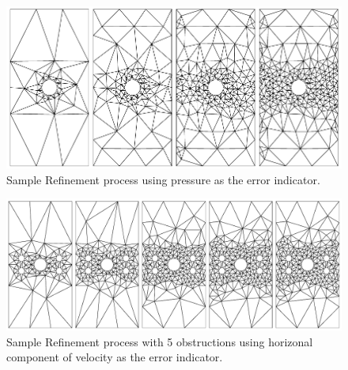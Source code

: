 \documentclass[wrr]{agutex}  %
\begin{document}
\begin{article}
\setcounter{subfigure}{0}
\begin{figure}[h]
\includegraphics[height=\h]{../plots/p_1_row.pdf}
\caption{Sample Refinement process using pressure as the error indicator.} \label{fig:refine_p1}
\end{figure} 

%
%
\break
\setcounter{subfigure}{0}
\begin{figure}[h]
\includegraphics[height=\h]{../plots/u_5_row.pdf}
\caption{Sample Refinement process with 5 obstructions using horizonal component of velocity as the error indicator.}   
\end{figure}


\end{article}
\end{document}
